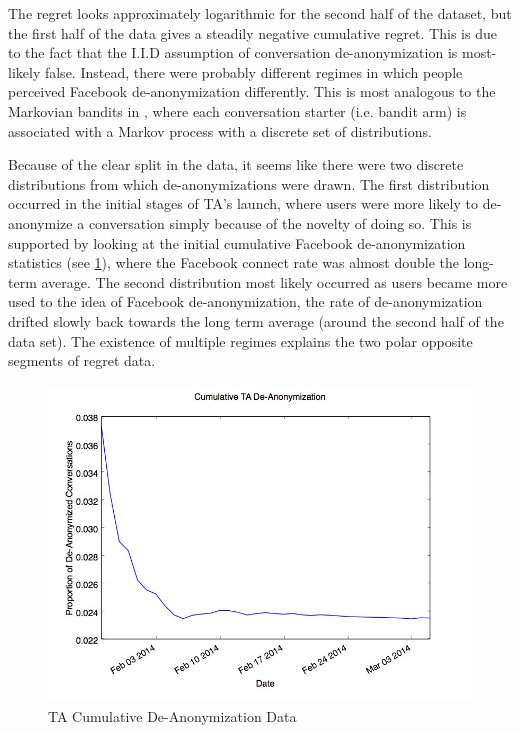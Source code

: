 The regret looks approximately logarithmic for the second half of the dataset, but the first half of the data gives a steadily negative cumulative regret. This is due to the fact that the I.I.D assumption of conversation de-anonymization is most-likely false. Instead, there were probably different regimes in which people perceived Facebook de-anonymization differently. This is most analogous to the Markovian bandits in \cite{bubeck12}, where each conversation starter (i.e. bandit arm) is associated with a Markov process with a discrete set of distributions.

Because of the clear split in the data, it seems like there were two discrete distributions from which de-anonymizations were drawn. The first distribution occurred in the initial stages of TA's launch, where users were more likely to de-anonymize a conversation simply because of the novelty of doing so. This is supported by looking at the initial cumulative Facebook de-anonymization statistics (see \ref{fig:TADe-AnonymizationCumulative}), where the Facebook connect rate was almost double the long-term average. The second distribution most likely occurred as users became more used to the idea of Facebook de-anonymization, the rate of de-anonymization drifted slowly back towards the long term average (around the second half of the data set). The existence of multiple regimes explains the two polar opposite segments of regret data.

\begin{figure}[htb]
\centering
\includegraphics[trim= 0mm 0mm 0mm 0mm, clip, scale=0.5]{./Figures/CumulativeTADe-Anonymization.jpg}
\caption{TA Cumulative De-Anonymization Data}
\label{fig:TADe-AnonymizationCumulative}
\end{figure}

